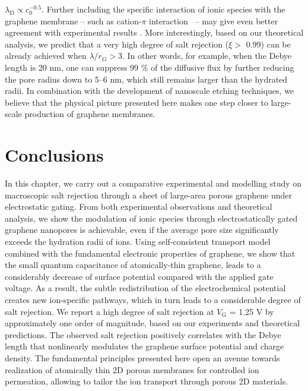 $\lambda_{\mathrm{D}} \propto c_{0}^{-0.5}$.
%
Further including
the specific interaction of ionic species with the graphene membrane
-- such as cation-$\pi$ interaction~\cite{Shi_2013_ion_enrichment} --
may give even better agreement with experimental results
\cite{Ghosh_2018_PG_ion}.
%
More interestingly, based on our theoretical
analysis, we predict that a very high degree of salt rejection ($\xi>$
0.99) can be already achieved when $\lambda / r_{\mathrm{G}}>$3.
%
In
other words, for example, when the Debye length is 20 nm, one can
suppress 99 \% of the diffusive flux by further reducing the pore
radius down to 5--6 nm, which still remains larger than the
hydrated radii.
%
In combination with the development of nanoscale
etching techniques, we believe that the physical picture presented
here makes one step closer to large-scale production of graphene
membranes.

\section{Conclusions}
\label{sec:np-conclusions}

In this chapter, we carry out a comparative experimental and modelling
study on macroscopic salt rejection through a sheet of large-area
porous graphene under electrostatic gating.
%
From both experimental observations and theoretical analysis, we show
the modulation of ionic species through electrostatically gated
graphene nanopores is achievable, even if the average pore size significantly exceeds the hydration radii of ions.
%
Using self-consistent transport model combined with the fundamental
electronic properties of graphene, we show that the small quantum
capacitance of atomically-thin graphene, leads to a considerably
decrease of surface potential compared with the applied gate
voltage.
%
As a result, the subtle redistribution of the electrochemical
potential creates new ion-specific pathways, which in turn
leads to a considerable degree of salt rejection.
%
We report a high
degree of salt rejection at $V_{\mathrm{G}}$ = 1.25 V by approximately
one order of magnitude, based on our experiments and theoretical
predictions.
%
The observed salt rejection positively correlates with the Debye
length that nonlinearly modulates the graphene surface potential and
charge density.
%
The fundamental principles presented here open an
avenue towards realization of atomically thin 2D porous membranes for
controlled ion permeation, allowing to tailor the ion transport
through porous 2D materials.

